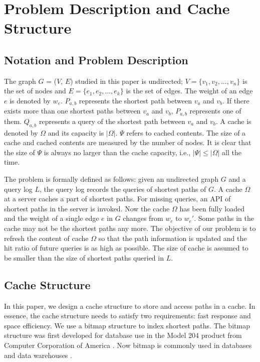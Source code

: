 \section{Problem Description and Cache Structure}
\label{sec:Cache Structure}
\subsection{Notation and Problem Description}
The graph $G$ = ($V$, $E$) studied in this paper is undirected; $V = \{v_1, v_2,..., v_n\}$ is the set of nodes and $E=\{e_1,e_2,...,e_k\}$ is the set of edges.
The weight of an edge $e$ is denoted by $w_e$.
$P_{a,b}$ represents the shortest path between $v_a$ and $v_b$. If there exists more than one shortest paths between $v_a$ and $v_b$, $P_{a,b}$ represents one of them.
$Q_{a,b}$ represents a query of the shortest path between $v_a$ and $v_b$.
A cache is denoted by $\Omega$ and its capacity is $|\Omega|$. $\Psi$ refers to cached contents. The size of a cache and cached contents are measured by the number of nodes. It is clear that the size of $\Psi$ is always no larger than the cache capacity, i.e., $|\Psi|\leq |\Omega|$ all the time.

The problem is formally defined as follows: given an undirected graph $G$ and a query log $L$, the query log records the queries of shortest paths of $G$.
A cache $\Omega$ at a server caches a part of shortest paths. For missing queries, an API of shortest paths in the server is invoked.
Now the cache $\Omega$ has been fully loaded and the weight of a single edge $e$ in $G$ changes from $w_e$ to $w_e'$. Some paths in the cache may not be the shortest paths any more.
The objective of our problem is to refresh the content of cache $\Omega$ so that the path information is updated and the hit ratio of future queries is as high as possible. The size of cache is assumed to be smaller than the size of shortest paths queried in $L$.


\subsection{Cache Structure}
In this paper, we design a cache structure to store and access paths in a cache.
In essence, the cache structure needs to satisfy two requirements: fast response and space efficiency.
We use a bitmap structure to index shortest paths. The bitmap structure was first developed for database use in the Model 204 product from Computer Corporation of America \citep{ONeil1997}. Now bitmap is commonly used in databases and data warehouses \citep{Wang2016}.

